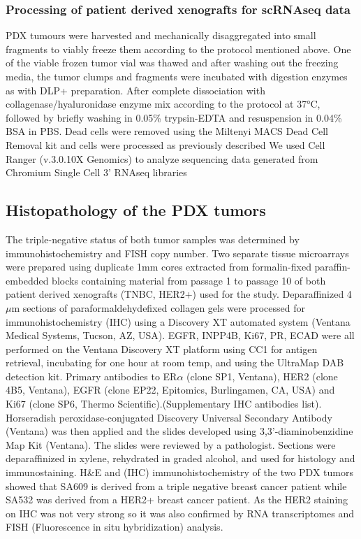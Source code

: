 \documentclass{article}
\begin{document}
\subsubsection{Processing of patient derived xenografts for scRNAseq data }
PDX tumours were harvested and mechanically disaggregated into small fragments to viably freeze them according to the protocol mentioned above. 
One of the viable frozen tumor vial was thawed and after washing out the freezing media, the tumor clumps and fragments were incubated with digestion enzymes as with DLP+ preparation. After complete dissociation with collagenase/hyaluronidase enzyme mix according to the protocol at 37°C, followed by briefly washing in 0.05\% trypsin-EDTA and resuspension in 0.04\% BSA in PBS. Dead cells were removed using the Miltenyi MACS Dead Cell Removal kit and cells were processed as previously described \cite{o2019dissociation}
We used Cell Ranger (v.3.0.10X Genomics) to analyze sequencing data generated from Chromium Single Cell 3’ RNAseq libraries

\subsection{Histopathology of the PDX tumors} 

The triple-negative status of both tumor samples was determined by immunohistochemistry and FISH copy number.
Two separate tissue microarrays were prepared using duplicate 1mm cores extracted from formalin-fixed paraffin-embedded blocks containing material from passage 1 to passage 10 of both patient derived xenografts (TNBC, HER2+) used for the study. 
Deparaffinized 4 $\mu$m sections of paraformaldehydefixed collagen gels were processed for immunohistochemistry (IHC) using a Discovery XT automated system (Ventana Medical Systems, Tucson, AZ, USA). 
EGFR, INPP4B, Ki67, PR, ECAD were all performed on the Ventana Discovery XT platform using CC1 for antigen retrieval, incubating for one hour at room temp, and using the UltraMap DAB detection kit.
Primary antibodies to ER$\alpha$ (clone SP1, Ventana), HER2 (clone 4B5, Ventana), EGFR (clone EP22, Epitomics, Burlingamen, CA, USA) and Ki67 (clone SP6, Thermo Scientific).(Supplementary IHC antibodies list). 
Horseradish peroxidase-conjugated Discovery Universal Secondary Antibody (Ventana) was then applied and the slides developed using 3,3’-diaminobenzidine Map Kit (Ventana). 
The slides were reviewed by a pathologist.
Sections were deparaffinized in xylene, rehydrated in graded alcohol, and used for histology and immunostaining.
H\&E and (IHC) immunohistochemistry of the two PDX tumors showed that SA609 is  derived from a triple negative breast cancer patient while SA532 was derived from a HER2+ breast cancer patient. As the HER2 staining on IHC was not very strong so it was also confirmed by RNA transcriptomes and FISH (Fluorescence in situ hybridization) analysis.
\end{document}

